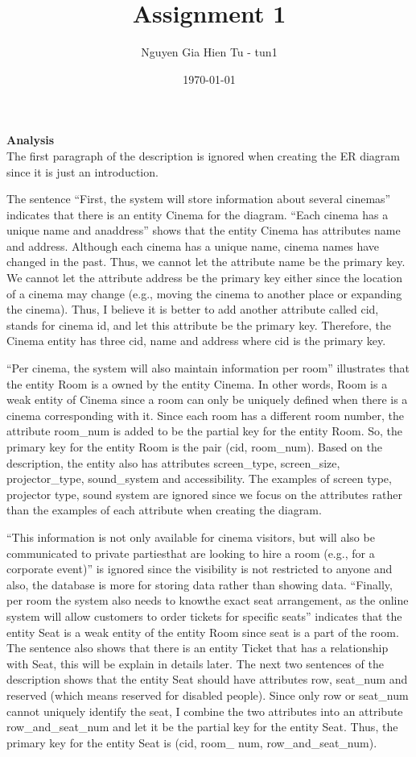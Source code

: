 \documentclass{article}
\title{Assignment 1}
\author{Nguyen Gia Hien Tu - tun1}
\date{\today}
\begin{document}
\maketitle

\textbf{Analysis} \\

The first paragraph of the description is ignored when creating the ER diagram
since it is just an introduction.

The sentence ``First, the system will store information about several cinemas''
indicates that there is an entity Cinema for the diagram. ``Each cinema has
a unique name and anaddress'' shows that the entity Cinema has attributes name
and address. Although each cinema has a unique name, cinema names have changed
in the past. Thus, we cannot let the attribute name be the primary key. We cannot
let the attribute address be the primary key either since the location of a
cinema may change (e.g., moving the cinema to another place or expanding the
cinema). Thus, I believe it is better to add another attribute called cid, stands
for cinema id, and let this attribute be the primary key. Therefore, the Cinema
entity has three cid, name and address where cid is the primary key.

``Per cinema, the system will also maintain information per room'' illustrates
that the entity Room is a owned by the entity Cinema. In other words, Room is a
weak entity of Cinema since a room can only be uniquely defined when there is a
cinema corresponding with it. Since each room has a different room number, the
attribute room\_num is added to be the partial key for the entity Room. So, the
primary key for the entity Room is the pair (cid, room\_num). Based on the 
description, the entity also has attributes screen\_type, screen\_size,
projector\_type, sound\_system and accessibility. The examples of screen type,
projector type, sound system are ignored since we focus on the attributes rather
than the examples of each attribute when creating the diagram.

``This information is not only available for cinema visitors, but will also be
communicated to private partiesthat are looking to hire a room (e.g., for a
corporate event)'' is ignored since the visibility is not restricted to anyone
and also, the database is more for storing data rather than showing data.
``Finally, per room the system also needs to knowthe exact seat arrangement, as
the online system will allow customers to order tickets for specific seats''
indicates that the entity Seat is a weak entity of the entity Room since seat is
a part of the room. The sentence also shows that there is an entity Ticket that
has a relationship with Seat, this will be explain in details later. The next two
sentences of the description shows that the entity Seat should have attributes
row, seat\_num and reserved (which means reserved for disabled people). Since
only row or seat\_num cannot uniquely identify the seat, I combine the two
attributes into an attribute row\_and\_seat\_num and let it be the partial key
for the entity Seat. Thus, the primary key for the entity Seat is (cid, room\_
num, row\_and\_seat\_num).
\end{document}

